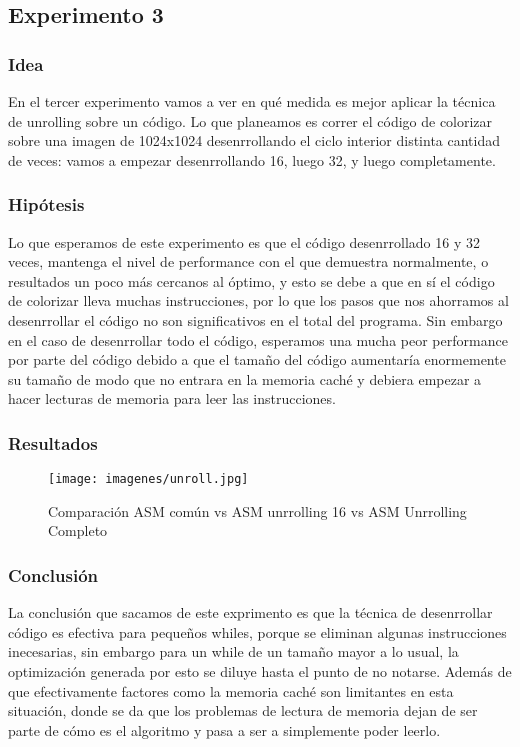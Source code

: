 \subsection{Experimento 3}

\subsubsection{Idea}
\par{En el tercer experimento vamos a ver en qué medida es mejor aplicar la técnica de unrolling sobre un código. Lo que planeamos es correr el código de colorizar sobre una imagen de 1024x1024 desenrrollando el ciclo interior distinta cantidad de veces: vamos a empezar desenrrollando 16, luego 32, y luego completamente.}

	   
\subsubsection{Hipótesis}
\par{Lo que esperamos de este experimento es que el código desenrrollado 16 y 32 veces, mantenga el nivel de performance con el que demuestra normalmente, o resultados un poco más cercanos al óptimo, y esto se debe a que en sí el código de colorizar lleva muchas instrucciones, por lo que los pasos que nos ahorramos al desenrrollar el código no son significativos en el total del programa. Sin embargo en el caso de desenrrollar todo el código, esperamos una mucha peor performance por parte del código debido a que el tamaño del código aumentaría enormemente su tamaño de modo que no entrara en la memoria caché y debiera empezar a hacer lecturas de memoria para leer las instrucciones.}
	
\subsubsection{Resultados}

\begin{figure}[H]
\centering
\captionsetup{justification=centering}
	\texttt{[image: imagenes/unroll.jpg]}
	\caption[center]{Comparación ASM común vs ASM unrrolling 16 vs ASM Unrrolling Completo}
\end{figure}
\medskip
	
\subsubsection{Conclusión}
\par{La conclusión que sacamos de este exprimento es que la técnica de desenrrollar código es efectiva para pequeños whiles, porque se eliminan algunas instrucciones inecesarias, sin embargo para un while de un tamaño mayor a lo usual, la optimización generada por esto se diluye hasta el punto de no notarse. Además de que efectivamente factores como la memoria caché son limitantes en esta situación, donde se da que los problemas de lectura de memoria dejan de ser parte de cómo es el algoritmo y pasa a ser a simplemente poder leerlo.}